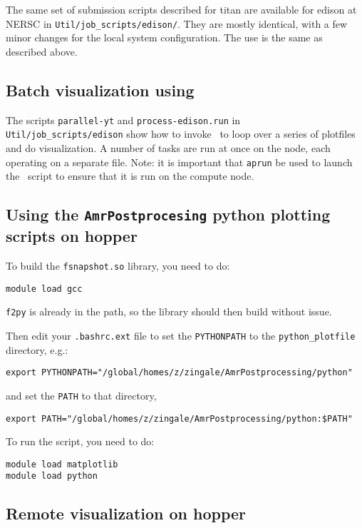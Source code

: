 The same set of submission scripts described for titan are available
for edison at NERSC in {\tt Util/job\_scripts/edison/}.  They are
mostly identical, with a few minor changes for the local system
configuration.  The use is the same as described above.

\subsection{Batch visualization using \yt}

The scripts {\tt parallel-yt} and {\tt process-edison.run} in {\tt
Util/job\_scripts/edison} show how to invoke \yt\ to loop over a 
series of plotfiles and do visualization.  A number of tasks are
run at once on the node, each operating on a separate file.  Note:
it is important that {\tt aprun} be used to launch the \yt\ script
to ensure that it is run on the compute node.

\subsection{Using the {\tt AmrPostprocesing} python plotting scripts on hopper}

To build the {\tt fsnapshot.so} library, you need to do:
\begin{verbatim}
module load gcc
\end{verbatim}
{\tt f2py} is already in the path, so the library should then build without issue.
%

Then edit your {\tt .bashrc.ext} file to set the {\tt PYTHONPATH} to
the {\tt python\_plotfile} directory, e.g.:
\begin{verbatim}
export PYTHONPATH="/global/homes/z/zingale/AmrPostprocessing/python"
\end{verbatim}
%
and set the {\tt PATH} to that directory,
\begin{verbatim}
export PATH="/global/homes/z/zingale/AmrPostprocessing/python:$PATH"
\end{verbatim}

To run the script, you need to do:
\begin{verbatim}
module load matplotlib
module load python
\end{verbatim}



\subsection{Remote visualization on hopper}


